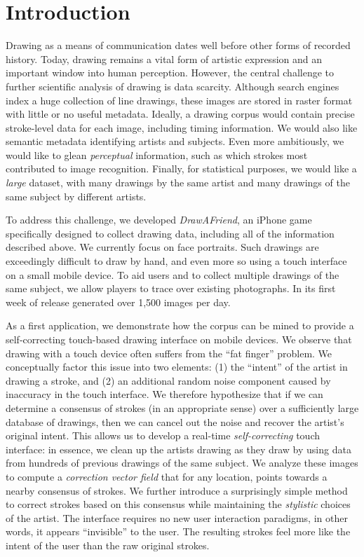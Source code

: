 \section{Introduction}

Drawing as a means of communication dates well before other forms of
recorded history. Today, drawing remains a vital form of artistic
expression and an important window into human perception. However,
the central challenge to further scientific analysis of drawing is
data scarcity. Although search engines index a huge collection of
line drawings, these images are stored in raster format with little
or no useful metadata. Ideally, a drawing corpus would contain
precise stroke-level data for each image, including timing
information. We would also like semantic metadata identifying
artists and subjects. Even more ambitiously, we would like to glean
\emph{perceptual} information, such as which strokes most
contributed to image recognition. Finally, for statistical purposes,
we would like a \emph{large} dataset, with many drawings by the same
artist and many drawings of the same subject by different artists.

To address this challenge, we developed \emph{DrawAFriend}, an
iPhone game specifically designed to collect drawing data, including
all of the information described above. We currently focus on face
portraits. Such drawings are exceedingly difficult to draw by hand,
and even more so using a touch interface on a small mobile device.
To aid users and to collect multiple drawings of the same subject,
we allow players to trace over existing photographs. In its first
week of release \daf generated over 1,500 images per day.

As a first application, we demonstrate how the \daf corpus can be
mined to provide a self-correcting touch-based drawing interface on
mobile devices. We observe that drawing with a touch device often
suffers from the ``fat finger'' problem. We conceptually factor this
issue into two elements: (1) the ``intent'' of the artist in drawing
a stroke, and (2) an additional random noise component caused by
inaccuracy in the touch interface. We therefore hypothesize that if
we can determine a consensus of strokes (in an appropriate sense)
over a sufficiently large database of drawings, then we can cancel
out the noise and recover the artist's original intent. This allows
us to develop a real-time {\em self-correcting} touch interface: in
essence, we clean up the artists drawing as they draw by using data
from hundreds of previous drawings of the same subject. We analyze
these images to compute a \emph{correction vector field} that for
any location, points towards a nearby consensus of strokes. We
further introduce a surprisingly simple method to correct strokes
based on this consensus while maintaining the {\em stylistic}
choices of the artist. The interface requires no new user
interaction paradigms, in other words, it appears ``invisible'' to
the user. The resulting strokes feel more like the intent of the
user than the raw original strokes.

